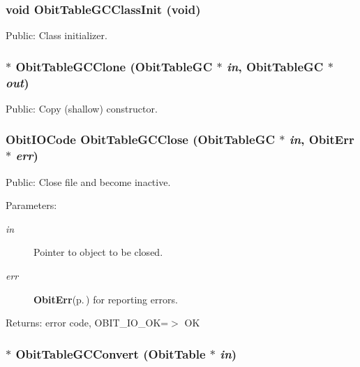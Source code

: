 \subsubsection{\setlength{\rightskip}{0pt plus 5cm}void Obit\-Table\-GCClass\-Init (void)}\label{ObitTableGC_8h_a10}


Public: Class initializer. 

\subsubsection{$\ast$ Obit\-Table\-GCClone ({\bf Obit\-Table\-GC} $\ast$ {\em in}, {\bf Obit\-Table\-GC} $\ast$ {\em out})}\label{ObitTableGC_8h_a15}


Public: Copy (shallow) constructor. 

\subsubsection{\setlength{\rightskip}{0pt plus 5cm}Obit\-IOCode Obit\-Table\-GCClose ({\bf Obit\-Table\-GC} $\ast$ {\em in}, {\bf Obit\-Err} $\ast$ {\em err})}\label{ObitTableGC_8h_a21}


Public: Close file and become inactive. 

\begin{Desc}
\item[Parameters:]
\begin{description}
\item[{\em in}]Pointer to object to be closed. \item[{\em err}]{\bf Obit\-Err}{\rm (p.\,\pageref{structObitErr})} for reporting errors. \end{description}
\end{Desc}
\begin{Desc}
\item[Returns:]error code, OBIT\_\-IO\_\-OK=$>$ OK \end{Desc}
\subsubsection{$\ast$ Obit\-Table\-GCConvert ({\bf Obit\-Table} $\ast$ {\em in})}\label{ObitTableGC_8h_a16}


